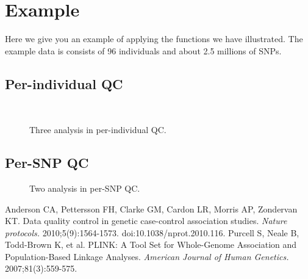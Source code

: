 \documentclass{article}
\begin{document}
\section{Example}
Here we give you an example of applying the functions we have illustrated. The example data is consists of 96 individuals and about 2.5 millions of SNPs.\\
\subsection{Per-individual QC}

\begin{figure}[h]
    \centering
    \\
    \caption{Three analysis in per-individual QC.}
\end{figure}
\subsection{Per-SNP QC}
\begin{figure}[h]
    \centering
    \caption{Two analysis in per-SNP QC.}
\end{figure}
\begin{thebibliography}{1}
 Anderson CA, Pettersson FH, Clarke GM, Cardon LR, Morris AP, Zondervan KT. {Data quality control in genetic case-control association studies. 
\em Nature protocols.} 2010;5(9):1564-1573. doi:10.1038/nprot.2010.116.
 Purcell S, Neale B, Todd-Brown K, et al. {PLINK: A Tool Set for Whole-Genome Association and Population-Based Linkage Analyses. 
\em American Journal of Human Genetics.} 2007;81(3):559-575.
\end{thebibliography}
\end{document}
